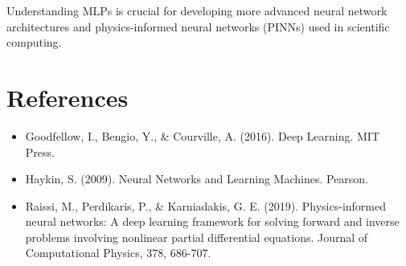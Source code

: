 \documentclass{article}
\begin{document}
Understanding MLPs is crucial for developing more advanced neural network architectures and physics-informed neural networks (PINNs) used in scientific computing.

\section{References}

\begin{itemize}
    \item Goodfellow, I., Bengio, Y., \& Courville, A. (2016). Deep Learning. MIT Press.
    \item Haykin, S. (2009). Neural Networks and Learning Machines. Pearson.
    \item Raissi, M., Perdikaris, P., \& Karniadakis, G. E. (2019). Physics-informed neural networks: A deep learning framework for solving forward and inverse problems involving nonlinear partial differential equations. Journal of Computational Physics, 378, 686-707.
\end{itemize}
\end{document}
